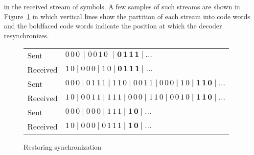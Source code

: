 \documentclass{irmaart}
\begin{document}
in the received stream of symbols. A few samples of such streams are shown
in Figure~\ref{KV:fig:decoding} in which vertical lines show the partition
of each stream into code words and the boldfaced code words indicate
the position at which the decoder resynchronizes.
\begin{figure}[h]
\begin{center}
\begin{tabular}{ll}
Sent & $0\,0\,0\ \mid 0\,0\,1\,0\,\ \mid\mathbf{0\,1\,1\,1\mid\dots}$\\
\mathstrut Received & $1\,0\mid 0\,0\,0 \mid 1\,0 \mid\mathbf{0\,1\,1\,1\mid\dots}$\\
\hline
\mathstrut Sent & $0\,0\,0\mid 0\,1\,1\,1 \mid 1\,1\,0\mid 0\,0\,1\,1 \mid 0\,0\,0 \mid 1\,0 \mid\mathbf{1\,1\,0\mid \dots}$\\
\mathstrut Received & $1\,0\mid 0\,0\,1\,1 \mid 1\,1\,1 \mid 0\,0\,0\mid 1\,1\,0 \mid 0\,0\,1\,0 \mid\mathbf{1\,1\,0\mid \dots}$\\
\hline
\mathstrut Sent & $0\,0\,0\mid 0\,0\,0 \mid 1\,1\,1\mid\mathbf{1\,0\mid \dots}$\\
\mathstrut Received & $1\,0\mid 0\,0\,0 \mid 0\,1\,1\,1 \mid\mathbf{1\,0\mid \dots}$
\end{tabular}
\caption{Restoring synchronization}\label{KV:fig:decoding}
\end{center}
\end{figure}
\end{document}

